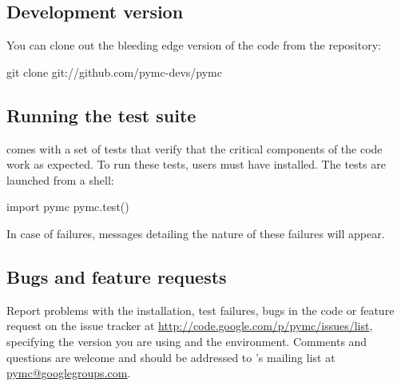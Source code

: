 \documentclass[]{jss}
\begin{document}

\subsection{Development version}
  \label{development-version}%


You can clone out the bleeding edge version of the code from the  \citep{git} 
repository:
\begin{CodeInput}
git clone git://github.com/pymc-devs/pymc
\end{CodeInput}



\subsection{Running the test suite}
  \label{running-the-test-suite}%


  comes with a set of tests that verify that the critical components
of the code work as expected. To run these tests, users must have 
installed. The tests are launched from a  shell:
\begin{CodeInput}
import pymc
pymc.test()
\end{CodeInput}

In case of failures, messages detailing the nature of these failures will
appear.



\subsection{Bugs and feature requests}
  \label{bugs-and-feature-requests}%


Report problems with the installation, test failures, bugs in the code or feature request
on the issue tracker at \href{http://code.google.com/p/pymc/issues/list}{http://code.google.com/p/pymc/issues/list},
specifying the version you are using and the environment. Comments and questions are welcome and should be
addressed to 's mailing list at \href{mailto:pymc@googlegroups.com}{pymc@googlegroups.com}.
\end{document}
